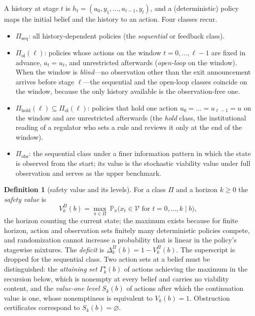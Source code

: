 \documentclass[11pt,a4paper]{article}
\theoremstyle{plain}
\theoremstyle{definition}
\newtheorem{definition}[theorem]{Definition}
\theoremstyle{remark}
\newcommand{\Prob}{\mathbb{P}}
\newcommand{\calV}{\mathcal{V}}
\newcommand{\hold}{\mathrm{hold}}
\newcommand{\ol}{\mathrm{ol}}
\newcommand{\seq}{\mathrm{seq}}
\newcommand{\obs}{\mathrm{obs}}
\begin{document}
A history at stage $t$ is $h_t=(a_0,y_1,\dots,a_{t-1},y_t)$, and a (deterministic) policy maps the initial belief and the history to an action. Four classes recur.
\begin{itemize}[leftmargin=1.6em,itemsep=1pt]
\item $\Pi_{\seq}$: all history-dependent policies (the \emph{sequential} or feedback class).
\item $\Pi_{\ol}(\ell)$: policies whose actions on the window $t=0,\dots,\ell-1$ are fixed in advance, $a_t=u_t$, and unrestricted afterwards (\emph{open-loop} on the window). When the window is \emph{blind}---no observation other than the exit announcement arrives before stage $\ell$---the sequential and the open-loop classes coincide on the window, because the only history available is the observation-free one.
\item $\Pi_{\hold}(\ell)\subseteq\Pi_{\ol}(\ell)$: policies that hold one action $u_0=\dots=u_{\ell-1}=u$ on the window and are unrestricted afterwards (the \emph{hold} class, the institutional reading of a regulator who sets a rule and reviews it only at the end of the window).
\item $\Pi_{\obs}$: the sequential class under a finer information pattern in which the state is observed from the start; its value is the stochastic viability value under full observation \cite{DoyenDeLara2010} and serves as the upper benchmark.
\end{itemize}

\begin{definition}[safety value and its levels]\label{def:value}
For a class $\Pi$ and a horizon $k\ge0$ the \emph{safety value} is
\[
V^{\Pi}_{k}(b)=\max_{\pi\in\Pi}\ \Prob_{\pi}\bigl(x_t\in\calV\text{ for }t=0,\dots,k\;\big|\;b\bigr),
\]
the horizon counting the current state; the maximum exists because for finite horizon, action and observation sets finitely many deterministic policies compete, and randomization cannot increase a probability that is linear in the policy's stagewise mixtures. The \emph{deficit} is $\Delta^{\Pi}_k(b)=1-V^{\Pi}_k(b)$. The superscript is dropped for the sequential class. Two action sets at a belief must be distinguished: the \emph{attaining set} $\Gamma^{\mathrm s}_k(b)$ of actions achieving the maximum in the recursion below, which is nonempty at every belief and carries no viability content, and the \emph{value-one level} $S_k(b)$ of actions after which the continuation value is one, whose nonemptiness is equivalent to $V_k(b)=1$. Obstruction certificates correspond to $S_k(b)=\varnothing$.
\end{definition}
\end{document}
